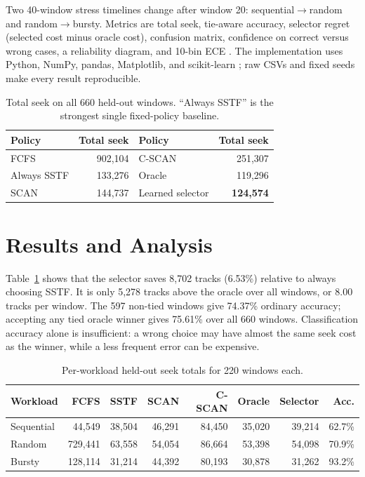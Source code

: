 \documentclass[10pt,a4paper]{article}
\begin{document}
Two 40-window stress timelines change after window 20: sequential$\rightarrow$random and random$\rightarrow$bursty. Metrics are total seek, tie-aware accuracy, selector regret (selected cost minus oracle cost), confusion matrix, confidence on correct versus wrong cases, a reliability diagram, and 10-bin ECE \cite{calibration}. The implementation uses Python, NumPy, pandas, Matplotlib, and scikit-learn \cite{sklearn}; raw CSVs and fixed seeds make every result reproducible.

\begin{table}[H]
\centering
\caption{Total seek on all 660 held-out windows. ``Always SSTF'' is the strongest single fixed-policy baseline.}
\label{tab:overall}
\small
\begin{tabular}{lr@{\qquad}lr}
\toprule
Policy & Total seek & Policy & Total seek \\
\midrule
FCFS & 902,104 & C-SCAN & 251,307 \\
Always SSTF & 133,276 & Oracle & 119,296 \\
SCAN & 144,737 & Learned selector & \textbf{124,574} \\
\bottomrule
\end{tabular}
\end{table}

\section{Results and Analysis}
Table~\ref{tab:overall} shows that the selector saves 8,702 tracks (6.53\%) relative to always choosing SSTF. It is only 5,278 tracks above the oracle over all windows, or 8.00 tracks per window. The 597 non-tied windows give 74.37\% ordinary accuracy; accepting any tied oracle winner gives 75.61\% over all 660 windows. Classification accuracy alone is insufficient: a wrong choice may have almost the same seek cost as the winner, while a less frequent error can be expensive.

\begin{table}[H]
\centering
\caption{Per-workload held-out seek totals for 220 windows each.}
\label{tab:workload}
\scriptsize
\begin{tabular}{lrrrrrrr}
\toprule
Workload & FCFS & SSTF & SCAN & C-SCAN & Oracle & Selector & Acc. \\
\midrule
Sequential & 44,549 & 38,504 & 46,291 & 84,450 & 35,020 & 39,214 & 62.7\% \\
Random & 729,441 & 63,558 & 54,054 & 86,664 & 53,398 & 54,098 & 70.9\% \\
Bursty & 128,114 & 31,214 & 44,392 & 80,193 & 30,878 & 31,262 & 93.2\% \\
\bottomrule
\end{tabular}
\end{table}
\end{document}
